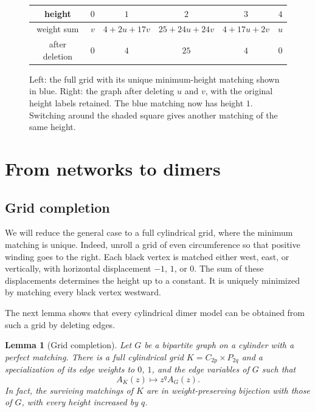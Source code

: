 \documentclass[11pt]{article}
\newtheorem{lemma}[theorem]{Lemma}
\theoremstyle{definition}
\theoremstyle{remark}
\begin{document}
\begin{figure}[htbp]
\begin{tabular}{@{}c c c c c c@{}}
\toprule
height & $0$ & $1$ & $2$ & $3$ & $4$\\
\midrule
weight sum & $v$ & $4+2u+17v$ & $25+24u+24v$ & $4+17u+2v$ & $u$\\
after deletion & $0$ & $4$ & $25$ & $4$ & $0$\\
\bottomrule
\end{tabular}
\caption{
Left: the full grid with its unique minimum-height
matching shown in blue. Right: the graph after deleting
$u$ and $v$, with the original height labels retained.
The blue matching now has height $1$. Switching around
the shaded square gives another matching of the same height.
}
\label{fig:minima}
\end{figure}

\FloatBarrier

\section{From networks to dimers}\label{sec:annular}\label{sec:superpositions}


\subsection{Grid completion}

We will reduce the general case to a full cylindrical
grid, where the minimum matching is unique.
Indeed, unroll a grid of even circumference so that
positive winding goes to the right. Each black vertex
is matched either west, east, or vertically, with
horizontal displacement $-1$, $1$, or $0$.
The sum of these displacements determines the height
up to a constant. It is uniquely minimized by
matching every black vertex westward.

The next lemma shows that every cylindrical dimer
model can be obtained from such a grid by deleting
edges.

\begin{lemma}[Grid completion]\label{lem:grid-completion}
Let $G$ be a bipartite graph on a cylinder with a
perfect matching. There is a full cylindrical grid
$K=C_{2p}\times P_{2q}$ and a specialization of its
edge weights to $0$, $1$, and the edge variables of
$G$ such that
\begin{equation}\label{eq:grid-completion}
A_K(z)\longmapsto z^q A_G(z).
\end{equation}
In fact, the surviving matchings of $K$ are in
weight-preserving bijection with those of $G$,
with every height increased by $q$.
\end{lemma}
\end{document}
